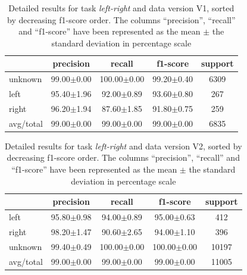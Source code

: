 \documentclass[review]{elsarticle}
\begin{document}
\begin{table} \centering \scriptsize
	\caption{Detailed results for task \textit{left-right} and data version V1, sorted by decreasing f1-score order. The columns ``precision'', ``recall'' and ``f1-score'' have been represented as the mean $\pm$ the standard deviation in percentage scale }
	\begin{tabular}{lcccc}
		\toprule
		{} &       precision &           recall &        f1-score & support \\
		\midrule
		unknown   &  99.00$\pm$0.00 &  100.00$\pm$0.00 &  99.20$\pm$0.40 &    6309 \\
		left      &  95.40$\pm$1.96 &   92.00$\pm$0.89 &  93.60$\pm$0.80 &     267 \\
		right     &  96.20$\pm$1.94 &   87.60$\pm$1.85 &  91.80$\pm$0.75 &     259 \\
		\midrule avg/total &  99.00$\pm$0.00 &   99.00$\pm$0.00 &  99.00$\pm$0.00 &    6835 \\
		\bottomrule
	\end{tabular}
	
\end{table}



\begin{table} \centering \scriptsize
	\caption{Detailed results for task \textit{left-right} and data version V2, sorted by decreasing f1-score order. The columns ``precision'', ``recall'' and ``f1-score'' have been represented as the mean $\pm$ the standard deviation in percentage scale }
	\begin{tabular}{lcccc}
		\toprule
		{} &       precision &           recall &         f1-score & support \\
		\midrule
		left      &  95.80$\pm$0.98 &   94.00$\pm$0.89 &   95.00$\pm$0.63 &     412 \\
		right     &  98.20$\pm$1.47 &   90.60$\pm$2.65 &   94.00$\pm$1.10 &     396 \\
		unknown   &  99.40$\pm$0.49 &  100.00$\pm$0.00 &  100.00$\pm$0.00 &   10197 \\
		\midrule avg/total &  99.00$\pm$0.00 &   99.00$\pm$0.00 &   99.00$\pm$0.00 &   11005 \\
		\bottomrule
	\end{tabular}
	
\end{table}
\end{document}
